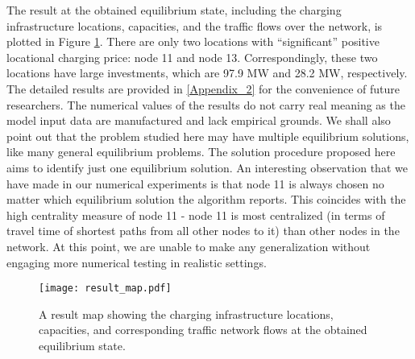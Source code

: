 
The result at the obtained equilibrium state, including the charging infrastructure locations, capacities, and the traffic flows over the network, is plotted in Figure \ref{fig:result_map}.  There are only two locations with ``significant'' positive locational charging price: node 11 and node 13. Correspondingly, these two locations have large investments, which are 97.9 MW and 28.2 MW, respectively.  The detailed results are provided in \ref{Appendix_2} for the convenience of future researchers.  The numerical values of the results do not carry real meaning as the model input data are manufactured and lack empirical grounds.  We shall also point out that the problem studied here may have multiple equilibrium solutions, like many general equilibrium problems.  The solution procedure proposed here aims to identify just one equilibrium solution.  An interesting observation that we have made in our numerical experiments is that node 11 is always chosen no matter which equilibrium solution the algorithm reports.  This coincides with the high centrality measure of node 11 - node 11 is most centralized (in terms of travel time of shortest paths from all other nodes to it) than other nodes in the network.   At this point, we are unable to make any generalization without engaging more numerical testing in realistic settings. 

\begin{figure}[htbp]
\begin{center}
    \texttt{[image: result\_map.pdf]}
\caption{A result map showing the charging infrastructure locations, capacities, and corresponding traffic network flows at the obtained equilibrium state.}
\label{fig:result_map}
\end{center}
\end{figure}
